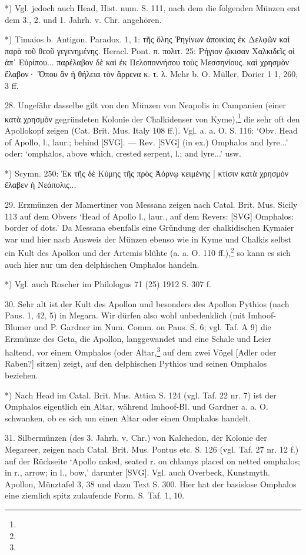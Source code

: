 \documentclass[a4paper, 11pt, oneside]{article}
\begin{document}
*) Vgl. jedoch auch Head, Hist. num. S. 111, nach dem die folgenden Münzen erst dem 3., 2. und 1. Jahrh. v. Chr. angehören.

*) Timaios b. Antigon. Paradox. 1, 1: τῆς ὅλης Ῥηγίνων ἀποικίας ἐκ Δελφῶν καὶ παρὰ τοῦ θεοῦ γεγενημένης. Heracl. Pont. π. πολιτ. 25: Ρήγιον ᾤκισαν Χαλκιδεῖς οἱ ἀπ᾿ Εὐρίπου... παρέλαβον δὲ καὶ ἐκ Πελοποννήσου τοὺς Μεσσηνίους. καὶ χρησμὸν ἔλαβον· Ὅπου ἂν ἡ θήλεια τὸν ἄρρενα κ. τ. λ. Mehr b. O. Müller, Dorier 1 1, 260, 3 ff.

28. Ungefähr dasselbe gilt von den Münzen von Neapolis in Campanien (einer κατὰ χρησμὸν gegründeten Kolonie der Chalkidenser von Kyme),\footnote{} die sehr oft den Apollokopf zeigen (Cat. Brit. Mus. Italy 108 ff.). Vgl. a. a. O. S. 116: `Obv. Head of Apollo, l., laur.; behind [SVG]. --- Rev. [SVG] (in ex.) Omphalos and lyre...' oder: `omphalos, above which, crested serpent, l.; and lyre...' usw.

*) Scymn. 250: Ἐκ τῆς δὲ Κύμης τῆς πρὸς Ἀόρνῳ κειμένης | κτίσιν κατὰ χρησμὸν ἔλαβεν ἡ Νεάπολις...

29. Erzmünzen der Mamertiner von Messana zeigen nach Catal. Brit. Mus. Sicily 113 auf dem Obvers `Head of Apollo l., laur., auf dem Revers: [SVG] Omphalos: border of dots.' Da Messana ebenfalls eine Gründung der chalkidischen Kymaier war und hier nach Ausweis der Münzen ebenso wie in Kyme und Chalkis selbst ein Kult des Apollon und der Artemis blühte (a. a. O. 110 ff.),\footnote{} so kann es sich auch hier nur um den delphischen Omphalos handeln.

*) Vgl. auch Roscher im Philologus 71 (25) 1912 S. 307 f.

30. Sehr alt ist der Kult des Apollon und besonders des Apollon Pythios (nach Paus. 1, 42, 5) in Megara. Wir dürfen also wohl unbedenklich (mit Imhoof-Blumer und P. Gardner im Num. Comm. on Paus. S. 6; vgl. Taf. A 9) die Erzmünze des Geta, die Apollon, langgewandet und eine Schale und Leier haltend, vor einem Omphalos (oder Altar,\footnote{} auf dem zwei Vögel [Adler oder Raben?] sitzen) zeigt, auf den delphischen Pythios und seinen Omphalos beziehen.

*) Nach Head im Catal. Brit. Mus. Attica S. 124 (vgl. Taf. 22 nr. 7) ist der Omphalos eigentlich ein Altar, während Imhoof-Bl. und Gardner a. a. O. schwanken, ob es sich um einen Altar oder einen Omphalos handelt.

31. Silbermünzen (des 3. Jahrh. v. Chr.) von Kalchedon, der Kolonie der Megareer, zeigen nach Catal. Brit. Mus. Pontus etc. S. 126 (vgl. Taf. 27 nr. 12 f.) auf der Rückseite `Apollo naked, seated r. on chlamys placed on netted omphalos; in r., arrow; in l., bow,' darunter [SVG]. Vgl. auch Overbeck, Kunstmyth. Apollon, Münztafel 3, 38 und dazu Text S. 300. Hier hat der basislose Omphalos eine ziemlich spitz zulaufende Form. S. Taf. 1, 10.
\end{document}
